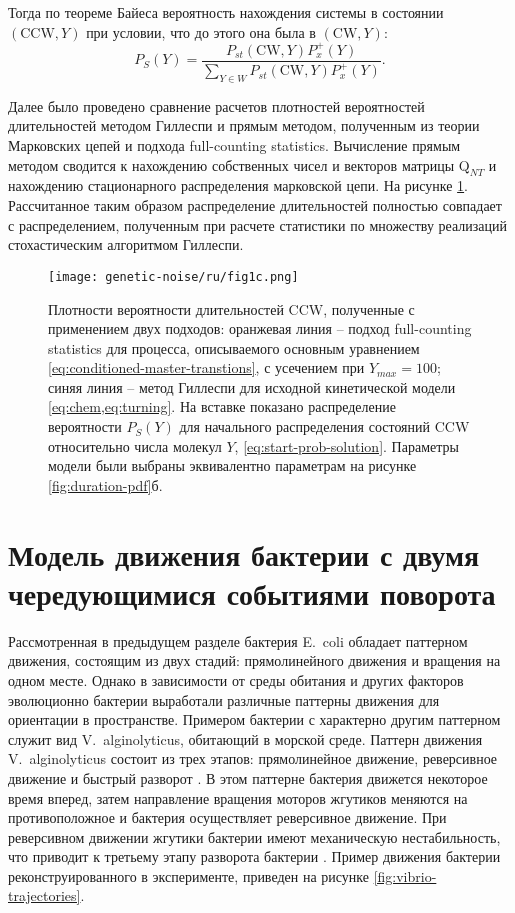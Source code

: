 Тогда по теореме Байеса вероятность нахождения системы в состоянии $(\mathrm{CCW}, Y)$ при условии, что до этого она была в $(\mathrm{CW}, Y)$:
\begin{equation}
    P_S(Y)=\frac{P_{st}(\mathrm{CW}, Y) P_x^+(Y)}{\sum_{Y\in W} P_{st}(\mathrm{CW}, Y) P_x^+(Y)}.
    \label{eq:start-prob-solution}
\end{equation}

Далее было проведено сравнение расчетов плотностей вероятностей длительностей методом Гиллеспи и прямым методом, полученным из теории Марковских цепей и подхода full-counting statistics. Вычисление прямым методом сводится к нахождению собственных чисел и векторов матрицы $\boldsymbol{\mathrm{Q}}_{NT}$ и нахождению стационарного распределения марковской цепи. На рисунке \cref{fig:gillespi-vs-direct}. Рассчитанное таким образом распределение длительностей полностью совпадает с распределением, полученным при расчете статистики по множеству реализаций стохастическим алгоритмом Гиллеспи.

\begin{figure}[ht]
    \centering
    \texttt{[image: genetic-noise/ru/fig1c.png]}
    \caption{
        Плотности вероятности длительностей CCW, полученные с применением двух подходов: оранжевая линия -- подход full-counting statistics для процесса, описываемого основным уравнением \cref{eq:conditioned-master-transtions}, с усечением при $Y_{max} = 100$; синяя линия -- метод Гиллеспи для исходной кинетической модели \cref{eq:chem,eq:turning}. На вставке показано распределение вероятности $P_S(Y)$ для начального распределения состояний CCW относительно числа молекул $Y$, \cref{eq:start-prob-solution}. Параметры модели были выбраны эквивалентно параметрам на рисунке \cref{fig:duration-pdf}б.
    }
    \label{fig:gillespi-vs-direct}
\end{figure}

\section{Модель движения бактерии с двумя чередующимися событиями поворота}\label{sec:ch2/sec2}

Рассмотренная в предыдущем разделе бактерия E.~coli обладает паттерном движения, состоящим из двух стадий: прямолинейного движения и вращения на одном месте. Однако в зависимости от среды обитания и других факторов эволюционно бактерии выработали различные паттерны движения для ориентации в пространстве. Примером бактерии с характерно другим паттерном служит вид V.~alginolyticus, обитающий в морской среде. Паттерн движения V.~alginolyticus состоит из трех этапов: прямолинейное движение, реверсивное движение и быстрый разворот \cite{xie_bacterial_2011}. В этом паттерне бактерия движется некоторое время вперед, затем направление вращения моторов жгутиков меняются на противоположное и бактерия осуществляет реверсивное движение. При реверсивном движении жгутики бактерии имеют механическую нестабильность, что приводит к третьему этапу разворота бактерии \cite{taute_high-throughput_2015}. Пример движения бактерии реконструированного в эксперименте, приведен на рисунке \cref{fig:vibrio-trajectories}.

